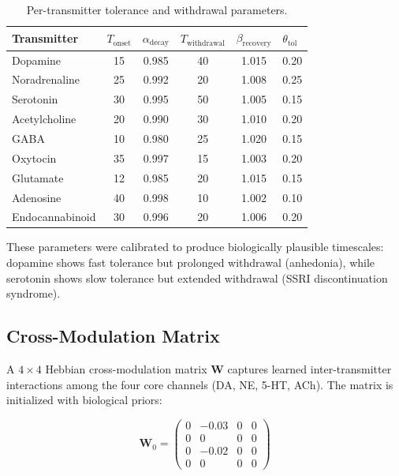\documentclass[11pt,a4paper]{article}
\begin{document}
\begin{table}[h]
\centering
\caption{Per-transmitter tolerance and withdrawal parameters.}
\label{tab:tolerance}
\begin{tabular}{lccccl}
\toprule
\textbf{Transmitter} & $T_{\text{onset}}$ & $\alpha_{\text{decay}}$ & $T_{\text{withdrawal}}$ & $\beta_{\text{recovery}}$ & $\theta_{\text{tol}}$ \\
\midrule
Dopamine & 15 & 0.985 & 40 & 1.015 & 0.20 \\
Noradrenaline & 25 & 0.992 & 20 & 1.008 & 0.25 \\
Serotonin & 30 & 0.995 & 50 & 1.005 & 0.15 \\
Acetylcholine & 20 & 0.990 & 30 & 1.010 & 0.20 \\
GABA & 10 & 0.980 & 25 & 1.020 & 0.15 \\
Oxytocin & 35 & 0.997 & 15 & 1.003 & 0.20 \\
Glutamate & 12 & 0.985 & 20 & 1.015 & 0.15 \\
Adenosine & 40 & 0.998 & 10 & 1.002 & 0.10 \\
Endocannabinoid & 30 & 0.996 & 20 & 1.006 & 0.20 \\
\bottomrule
\end{tabular}
\end{table}

These parameters were calibrated to produce biologically plausible timescales: dopamine shows fast tolerance but prolonged withdrawal (anhedonia), while serotonin shows slow tolerance but extended withdrawal (SSRI discontinuation syndrome).

\subsection{Cross-Modulation Matrix}

A $4 \times 4$ Hebbian cross-modulation matrix $\mathbf{W}$ captures learned inter-transmitter interactions among the four core channels (DA, NE, 5-HT, ACh). The matrix is initialized with biological priors:

\begin{equation}
\mathbf{W}_0 = \begin{pmatrix}
0 & -0.03 & 0 & 0 \\
0 & 0 & 0 & 0 \\
0 & -0.02 & 0 & 0 \\
0 & 0 & 0 & 0
\end{pmatrix}
\end{equation}
\end{document}
